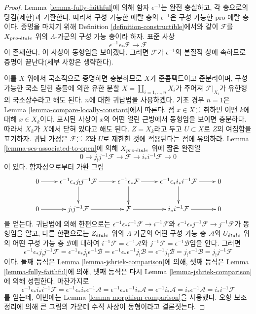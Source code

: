 \begin{proof}
Lemma \ref{lemma-fully-faithful}에 의해 함자 $\epsilon^{-1}$는 완전
충실하고, 각 층으로의 당김(제한)과 가환한다. 따라서 구성 가능한
에탈 층의 $\epsilon^{-1}$은 구성 가능한 pro-에탈 층이다. 증명을
마치기 위해 Definition \ref{definition-constructible}에서와 같이
$\mathcal{F}$를 $X_{pro\text{-}\acute{e}tale}$ 위의 $\Lambda$-가군의 구성 가능 층이라
하자. 표준 사상
$$
\epsilon^{-1}\epsilon_*\mathcal{F} \longrightarrow \mathcal{F}
$$
이 존재한다. 이 사상이 동형임을 보이겠다. 그러면 $\mathcal{F}$가
$\epsilon^{-1}$의 본질적 상에 속하므로 증명이 끝난다(세부 사항은
생략한다).

\medskip\noindent
이를 $X$ 위에서 국소적으로 증명하면 충분하므로 $X$가 준콤팩트이고
준분리이며, 구성 가능한 국소 닫힌 층들에 의한 유한 분할
$X = \coprod_{i = 1, \ldots, n} X_i$가 주어져
$\mathcal{F}|_{X_i}$가 유한형의 국소상수라고 해도 된다. $n$에 대한
귀납법을 사용하겠다. 기초 경우 $n = 1$은 Lemma
\ref{lemma-compare-locally-constant}에서 따른다. 점 $x \in X$를
취하면 어떤 $k$에 대해 $x \in X_k$이다. 표시된 사상이 $x$의 어떤
열린 근방에서 동형임을 보이면 충분하다. 따라서 $X_k$가 $X$에서
닫혀 있다고 해도 된다. $Z = X_k$라고 두고 $U \subset X$로 $Z$의
여집합을 표기하자. 귀납 가정은 $\mathcal{F}$를 $Z$와 $U$로 제한한
것에 적용된다는 점에 유의하라. Lemma
\ref{lemma-ses-associated-to-open}에 의해 $X_{pro\text{-}\acute{e}tale}$ 위에 짧은
완전열
$$
0 \to j_!j^{-1}\mathcal{F} \to \mathcal{F} \to i_*i^{-1}\mathcal{F} \to 0
$$
이 있다. 함자성으로부터 가환 그림
$$
\xymatrix{
0 \ar[r] &
\epsilon^{-1}\epsilon_*j_!j^{-1}\mathcal{F} \ar[r] \ar[d] &
\epsilon^{-1}\epsilon_*\mathcal{F} \ar[r] \ar[d] &
\epsilon^{-1}\epsilon_*i_*i^{-1}\mathcal{F} \ar[r] \ar[d] & 0 \\
0 \ar[r] &
j_!j^{-1}\mathcal{F} \ar[r] &
\mathcal{F} \ar[r] &
i_*i^{-1}\mathcal{F} \ar[r] & 0
}
$$
을 얻는다. 귀납법에 의해 한편으로는
$\epsilon^{-1}\epsilon_*i^{-1}\mathcal{F} \to i^{-1}\mathcal{F}$와
$\epsilon^{-1}\epsilon_*j^{-1}\mathcal{F} \to j^{-1}\mathcal{F}$가
동형임을 알고, 다른 한편으로는 $Z_{\acute{e}tale}$ 위의 $\Lambda$-가군의
어떤 구성 가능 층 $\mathcal{A}$와 $U_{\acute{e}tale}$ 위의 어떤 구성 가능 층
$\mathcal{B}$에 대하여
$i^{-1}\mathcal{F} = \epsilon^{-1}\mathcal{A}$와
$j^{-1}\mathcal{F} = \epsilon^{-1}\mathcal{B}$임을 안다. 그러면
$$
\epsilon^{-1}\epsilon_*j_!j^{-1}\mathcal{F} =
\epsilon^{-1}\epsilon_*j_!\epsilon^{-1}\mathcal{B} =
\epsilon^{-1}\epsilon_*\epsilon^{-1}j_!\mathcal{B} =
\epsilon^{-1}j_!\mathcal{B} =
j_!\epsilon^{-1}\mathcal{B} =
j_!j^{-1}\mathcal{F}
$$
이다. 둘째 등식은 Lemma \ref{lemma-jshriek-comparison}에 의해,
셋째 등식은 Lemma \ref{lemma-fully-faithful}에 의해, 넷째 등식은 다시
Lemma \ref{lemma-jshriek-comparison}에 의해 성립한다. 마찬가지로
$$
\epsilon^{-1}\epsilon_*i_*i^{-1}\mathcal{F} =
\epsilon^{-1}\epsilon_*i_*\epsilon^{-1}\mathcal{A} =
\epsilon^{-1}\epsilon_*\epsilon^{-1}i_*\mathcal{A} =
\epsilon^{-1}i_*\mathcal{A} =
i_*\epsilon^{-1}\mathcal{A} =
i_*i^{-1}\mathcal{F}
$$
를 얻는데, 이번에는 Lemma \ref{lemma-morphism-comparison}을 사용했다.
오항 보조정리에 의해 큰 그림의 가운데 수직 사상이 동형이라고
결론짓는다.
\end{proof}


